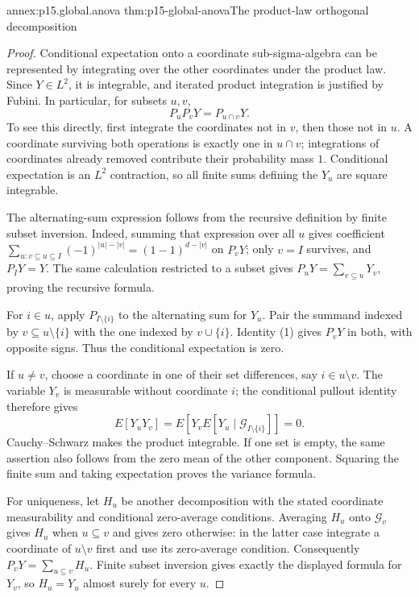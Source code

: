 \begin{annexitem}{annex:p15.global.anova}
 {thm:p15-global-anova}{The product-law orthogonal decomposition}
\begin{proof}
Conditional expectation onto a coordinate sub-sigma-algebra can be
represented by integrating over the other coordinates under the product
law. Since \(Y\in L^2\), it is integrable, and iterated product integration
is justified by Fubini. In particular, for subsets \(u,v\),
\[
 P_uP_vY=P_{u\cap v}Y.
 \tag{1}
\]
To see this directly, first integrate the coordinates not in \(v\), then
those not in \(u\). A coordinate surviving both operations is exactly one
in \(u\cap v\); integrations of coordinates already removed contribute
their probability mass \(1\).
Conditional expectation is an \(L^2\) contraction, so all finite sums
defining the \(Y_u\) are square integrable.

The alternating-sum expression follows from the recursive definition by
finite subset inversion. Indeed, summing that expression over all \(u\)
gives coefficient
\(\sum_{u:v\subseteq u\subseteq I}(-1)^{|u|-|v|}
  =(1-1)^{d-|v|}\)
on \(P_vY\); only \(v=I\) survives, and \(P_IY=Y\).
The same calculation restricted to a subset gives
\(P_uY=\sum_{v\subseteq u}Y_v\), proving the recursive formula.

For \(i\in u\), apply \(P_{I\setminus\{i\}}\) to the alternating sum
for \(Y_u\). Pair the summand indexed by \(v\subseteq u\setminus\{i\}\)
with the one indexed by \(v\cup\{i\}\).
Identity (1) gives \(P_vY\) in both, with opposite signs.
Thus the conditional expectation is zero.

If \(u\ne v\), choose a coordinate in one of their set differences,
say \(i\in u\setminus v\). The variable \(Y_v\) is measurable without
coordinate \(i\); the conditional pullout identity therefore gives
\[
 E[Y_uY_v]
  =E\!\left[Y_v E[Y_u\mid\mathcal G_{I\setminus\{i\}}]\right]=0.
\]
Cauchy--Schwarz makes the product integrable. If one set is empty,
the same assertion also follows from the zero mean of the other component.
Squaring the finite sum and taking expectation proves the variance formula.

For uniqueness, let \(H_u\) be another decomposition with the stated
coordinate measurability and conditional zero-average conditions.
Averaging \(H_u\) onto \(\mathcal G_v\) gives \(H_u\) when \(u\subseteq v\)
and gives zero otherwise: in the latter case integrate a coordinate of
\(u\setminus v\) first and use its zero-average condition.
Consequently \(P_vY=\sum_{u\subseteq v}H_u\).
Finite subset inversion gives exactly the displayed formula for \(Y_v\),
so \(H_u=Y_u\) almost surely for every \(u\).
\end{proof}
\end{annexitem}


